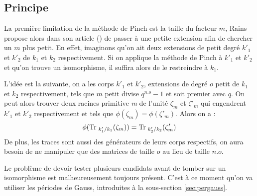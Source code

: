 \documentclass[a4paper]{article} %
\numberwithin{section}{part}
\numberwithin{equation}{section}
\newcommand\nroot[1]{\textit{#1}\up{\textit{ième}}}
\begin{document}
\subsection{Principe}
La première limitation de la méthode de Pinch est la taille du facteur
$m$, Rains propose alors dans son article (\cite{Rai}) de passer à une petite
extension afin de chercher un $m$ plus petit. En effet, imaginons qu'on ait deux
extensions de petit degré $k'_1$ et $k'_2$ de $k_1$ et $k_2$ respectivement. Si
on applique la méthode de Pinch à $k'_1$ et $k'_2$ et qu'on trouve un
isomorphisme, il suffira alors de le restreindre à $k_1$.\par
\vspace{0.3cm}
L'idée est la suivante, on a les corps $k'_1$ et $k'_2$, extensions de degré $o$
petit de $k_1$ et $k_2$ respectivement, tels que $m$ petit divise $q^{n.o} -
1$ et soit premier avec $q$. On peut alors trouver deux racines primitive
\nroot{m} de l'unité $\zeta_{m}$ et $\zeta'_m$ qui engendrent $k'_1$ et $k'_2$
respectivement et tels que $\phi(\zeta_m) = \phi(\zeta'_m)$. Alors on a : 
\[\phi(\textup{Tr\;}_{k'_1/k_1}(\zeta_{m})) =
\textup{Tr\;}_{k'_2/k_2}(\zeta'_{m})\]
De plus, les traces sont aussi des générateurs de leurs corps respectifs, on 
aura besoin de ne manipuler que des matrices de taille $o$ au lieu de taille 
$n.o$.\par
Le problème de devoir tester plusieurs candidats avant de tomber sur un 
isomorphisme est malheureusement toujours présent. C'est à ce moment qu'on va
utiliser les périodes de Gauss, introduites à la sous-section 
\ref{sec:pergauss}.

\vspace{0.3cm}
\end{document}
